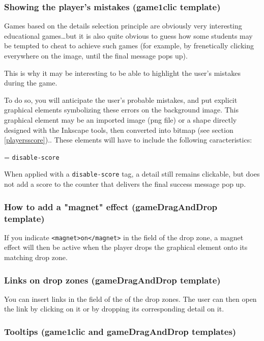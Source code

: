 \subsubsection{Showing the player's mistakes (game1clic template)}

Games based on the details selection principle are obviously very
interesting educational games\ldots but it is also quite obvious to guess how some 
students may be tempted to cheat to achieve such games (for example, by 
frenetically clicking everywhere on the image, until the final message pops up).

This is why it may be interesting to be able to 
highlight the user's mistakes during the game.

To do so, you will anticipate the user's probable mistakes, and 
put explicit graphical elements symbolizing these errors on the background image. 
This graphical element may be an imported image 
(png file) or a shape directly designed with the Inkscape tools, 
then converted into bitmap (see section \ref{playersscore}).. These elements will have to include the following caracteristics:
\begin{center}
 = \verb|disable-score| 
\end{center}
When applied with a \verb|disable-score| tag, a detail still remains clickable, but does not 
add a score to the counter that delivers the final success message pop up.


\subsubsection{How to add a "magnet" effect (gameDragAndDrop template)}

If you indicate \verb|<magnet>on</magnet>| in the  field of the drop zone, a magnet effect will then be active when the player drops the 
graphical element onto its matching drop zone.

\subsubsection{Links on drop zones (gameDragAndDrop template)}
 
You can insert links in the  field of the  
of the drop zones. The user can then open the link by clicking on it or by dropping its 
corresponding detail on it.


\subsubsection{Tooltips (game1clic and gameDragAndDrop templates)}

